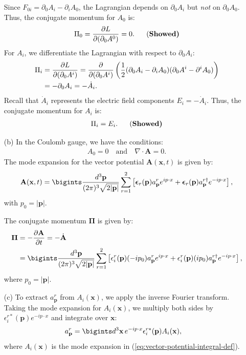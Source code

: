 \begin{enumerate}
Since $F_{0i} = \partial_0 A_i - \partial_i A_0$, the Lagrangian depends on $\partial_0 A_i$ but \emph{not} on $\partial_0 A_0$. Thus, the conjugate momentum for $A_0$ is:
\begin{align}
    \Pi_0 = \frac{\partial L}{\partial (\partial_0 A^0)} = 0.~~~~~\text{(\bf Showed)}
\end{align}
For $A_i$, we differentiate the Lagrangian with respect to $\partial_0 A_i$:
\begin{align}
    \Pi_i &= \frac{\partial L}{\partial (\partial_0 A^i)} = \frac{\partial}{\partial (\partial_0 A^i)} \left( \frac{1}{2} (\partial_0 A_i - \partial_i A_0)(\partial_0 A^i - \partial^i A_0) \right)\notag\\
    &= -\partial_0 A_i = -\dot{A}_i. 
\end{align}
Recall that $\dot{A}_i$ represents the electric field components $E_i = -\dot{A}_i$. Thus, the conjugate momentum for $A_i$ is:
\begin{align}
    \Pi_i = E_i.~~~~~\text{(\bf Showed)}
\end{align}
\item [(b)] In the Coulomb gauge, we have the conditions:
\begin{align*}
    A_0 = 0 \quad \text{and} \quad \nabla \cdot \mathbf{A} = 0.
\end{align*}
The mode expansion for the vector potential $\mathbf{A}(\mathbf{x}, t)$ is given by:
\begin{align*}
    \mathbf{A}(\mathbf{x}, t) = \bigints\frac{d^3 \mathbf{p}}{(2\pi)^3 \sqrt{2|\mathbf{p}|}} \sum_{r=1}^2 \left[ \boldsymbol{\epsilon}_r(\mathbf{p}) a^r_{\mathbf{p}} e^{i p \cdot x} + \boldsymbol{\epsilon}_r(\mathbf{p}) a^{r\dagger}_{\mathbf{p}} e^{-i p \cdot x} \right],\label{eq:vector-potential-integral-def}
\end{align*}
with $p_0 = |\mathbf{p}|$.

The conjugate momentum $\boldsymbol{\Pi}$ is given by:
\begin{align}
    \boldsymbol{\Pi} &= -\frac{\partial \mathbf{A}}{\partial t} = -\dot{\mathbf{A}}\notag\\
    &= \bigints\frac{d^3 \mathbf{p}}{(2\pi)^3 \sqrt{2|\mathbf{p}|}} \sum_{r=1}^2 \left[ \epsilon_i^r(\mathbf{p}) (-i p_0) a^r_{\mathbf{p}} e^{i p \cdot x} + \epsilon_i^r(\mathbf{p}) (i p_0) a^{r\dagger}_{\mathbf{p}} e^{-i p \cdot x} \right],
\end{align}
where $p_0 = |\mathbf{p}|$.
\item [(c)] 
To extract $a^r_{\mathbf{p}}$ from $A_i(\mathbf{x})$, we apply the inverse Fourier transform. Taking the mode expansion for $A_i(\mathbf{x})$, we multiply both sides by $\epsilon_i^{r*}(\mathbf{p}) e^{-i p \cdot x}$ and integrate over $\mathbf{x}$:
\begin{align}
    a^r_{\mathbf{p}} &= \bigints d^3 \mathbf{x} \, e^{-i p \cdot x} \epsilon_i^{r*}(\mathbf{p}) A_i(\mathbf{x}),
\end{align}
where $A_i(\mathbf{x})$ is the mode expansion in (\ref{eq:vector-potential-integral-def}).


\end{enumerate}
